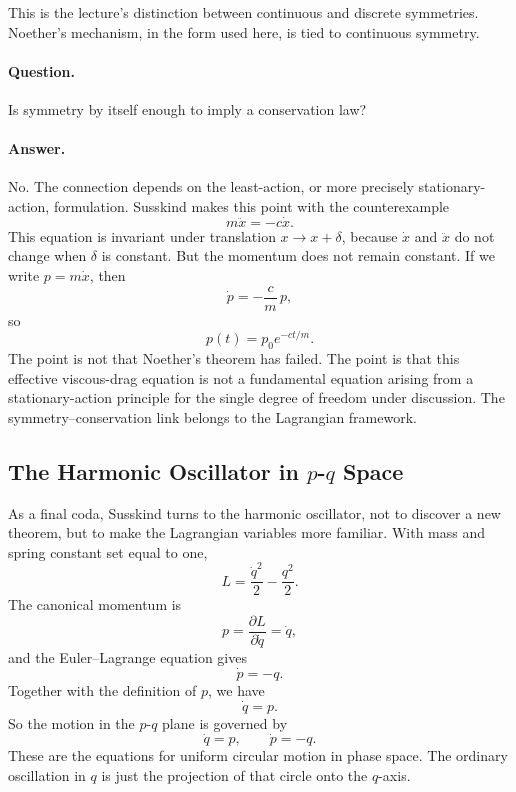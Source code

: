 This is the lecture's distinction between continuous and discrete symmetries. Noether's mechanism, in the form used here, is tied to continuous symmetry.

\paragraph{Question.} Is symmetry by itself enough to imply a conservation law?

\paragraph{Answer.} No. The connection depends on the least-action, or more precisely stationary-action, formulation. Susskind makes this point with the counterexample
\begin{equation}
m\ddot x=-c\dot x.
\end{equation}
This equation is invariant under translation \(x\to x+\delta\), because \(\dot x\) and \(\ddot x\) do not change when \(\delta\) is constant. But the momentum does not remain constant. If we write \(p=m\dot x\), then
\begin{equation}
\dot p=-\frac{c}{m}\,p,
\end{equation}
so
\begin{equation}
p(t)=p_0 e^{-ct/m}.
\end{equation}
The point is not that Noether's theorem has failed. The point is that this effective viscous-drag equation is not a fundamental equation arising from a stationary-action principle for the single degree of freedom under discussion. The symmetry--conservation link belongs to the Lagrangian framework.

\subsection{The Harmonic Oscillator in \(p\)-\(q\) Space}

As a final coda, Susskind turns to the harmonic oscillator, not to discover a new theorem, but to make the Lagrangian variables more familiar. With mass and spring constant set equal to one,
\begin{equation}
L=\frac{\dot q^2}{2}-\frac{q^2}{2}.
\end{equation}
The canonical momentum is
\begin{equation}
p=\frac{\partial L}{\partial \dot q}=\dot q,
\end{equation}
and the Euler--Lagrange equation gives
\begin{equation}
\dot p=-q.
\end{equation}
Together with the definition of \(p\), we have
\begin{equation}
\dot q=p.
\end{equation}
So the motion in the \(p\)-\(q\) plane is governed by
\begin{equation}
\dot q=p,
\qquad
\dot p=-q.
\end{equation}
These are the equations for uniform circular motion in phase space. The ordinary oscillation in \(q\) is just the projection of that circle onto the \(q\)-axis.

